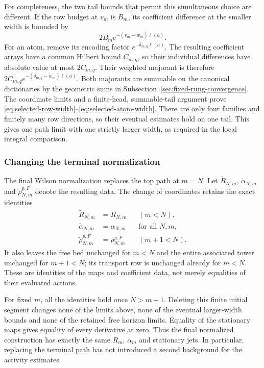 For completeness, the two tail bounds that permit this simultaneous
choice are different. If the row budget at $v_m$ is $B_m$, its
coefficient difference at the smaller width is bounded by
\[2B_m e^{-(v_m-\widetilde w_m)\ell(a)}.\]
For an atom, remove its
encoding factor $e^{-\delta_{m,q}\ell(a)}$. The resulting coefficient
arrays have a common Hilbert bound $C_{m,q}$, so their individual
differences have absolute value at most $2C_{m,q}$. Their weighted
majorant is therefore
$2C_{m,q}e^{-(\delta_{m,q}-\widetilde w_m)\ell(a)}$.
Both majorants are summable on the canonical dictionaries by the
geometric sums in Subsection~\ref{sec:fixed-rung-convergence}. The
coordinate limits and a finite-head, summable-tail argument prove
\eqref{eq:selected-row-width}--\eqref{eq:selected-atom-width}.
There are only four families and finitely many row directions, so
their eventual estimates hold on one tail. This gives one path
limit with one strictly larger width, as required in the local
integral comparison.

\subsubsection{Changing the terminal normalization}
The final Wilson normalization replaces the top path at $m=N$.
Let $\widetilde R_{N,m}$, $\widetilde\alpha_{N,m}$ and
$\widetilde\rho_{N,m}^{p,F}$ denote the resulting data. The change
of coordinates retains the exact identities
\begin{align*}
 \widetilde R_{N,m}&=R_{N,m}&& (m<N),\\
 \widetilde\alpha_{N,m}&=\alpha_{N,m}&&\text{for all }N,m,\\
 \widetilde\rho_{N,m}^{p,F}&=\rho_{N,m}^{p,F}&&(m+1<N).
\end{align*}
It also leaves the free bed unchanged for $m<N$ and the entire
associated tower unchanged for $m+1<N$; its transport row is
unchanged already for $m<N$. These are identities of the maps and
coefficient data, not merely equalities of their evaluated actions.

For fixed $m$, all the identities hold once $N>m+1$. Deleting this
finite initial segment changes none of the limits above, none of
the eventual larger-width bounds and none of the retained free
horizon limits. Equality of the stationary maps gives equality of
every derivative at zero. Thus the final normalized construction
has exactly the same $R_m$, $\alpha_m$ and stationary jets. In
particular, replacing the terminal path has not introduced a second
background for the activity estimates.


